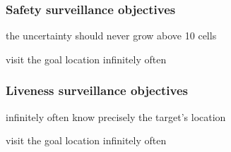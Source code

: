 \documentclass[xcolor=dvipsnames]{beamer}
\begin{document}
\begin{frame}
\frametitle{Safety surveillance objectives}


 the uncertainty should never grow above 10 cells

\smallskip

 visit the goal location infinitely often


\bigskip

 \begin{center} 

 \end{center}

\end{frame}

\begin{frame}
\frametitle{Liveness surveillance objectives}


 infinitely often know precisely the target's location

\smallskip

 visit the goal location infinitely often


\bigskip

 \begin{center} 

 \end{center}

\end{frame}
\end{document}
